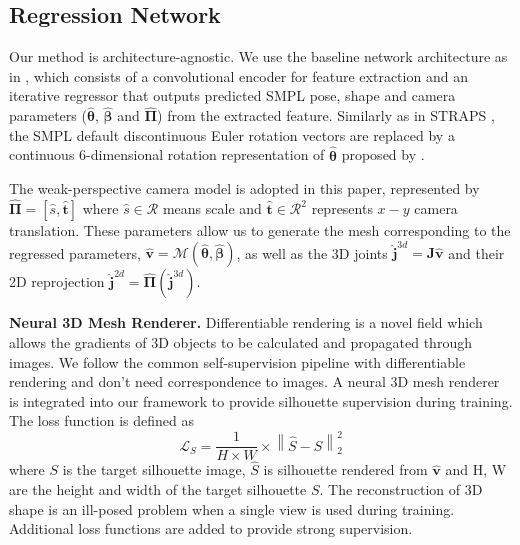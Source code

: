 \documentclass[journal]{IEEEtran}
\begin{document}
\subsection{Regression Network}
\label{sec:regression}
Our method is architecture-agnostic. We use the baseline network architecture as in \cite{ kanazawa2018end, kolotouros2019spin,STRAPS2020BMVC}, which consists of a convolutional encoder for feature extraction and an iterative regressor that outputs predicted SMPL pose, shape and camera parameters ($\hat{\bm{\theta}}$, $\hat{\bm{\beta}}$ and $\hat{\bm{\Pi}}$) from the extracted feature. Similarly as in STRAPS \cite{STRAPS2020BMVC}, the SMPL default discontinuous Euler rotation vectors are replaced by a continuous 6-dimensional rotation representation of $\hat{\bm{\theta}}$ proposed by \cite{zhou2019continuity}.

The weak-perspective camera model is adopted in this paper, represented by $\hat{\bm{\Pi}} = [\hat{s},\hat{\bm{t}}]$ where $\hat{s} \in \mathcal{R}$ means scale and $\hat{\bm{t}} \in \mathcal{R}^2$ represents ${x-y}$ camera translation. These parameters allow us to generate the mesh corresponding to the regressed parameters, $\hat{\bm{v}}=\mathcal{M}(\hat{\bm{\theta}}, \hat{\bm{\beta}})$, as well as the 3D joints $\hat{\bm{j}}^{3d} = \bm{J}\hat{\bm{v}}$ and their 2D reprojection $\hat{\bm{j}}^{2d}=\hat{\bm{\Pi}}(\hat{\bm{j}}^{3d})$.


\noindent\textbf{Neural 3D Mesh Renderer.} Differentiable rendering is a novel field which allows the gradients of 3D objects to be calculated and propagated through images. We follow the common self-supervision pipeline with differentiable rendering and don't need correspondence to images. A neural 3D mesh renderer  \cite{kato2018neural} is integrated into our framework to provide silhouette supervision during training. The loss function is defined as 
\begin{equation}\label{eq_L_sil}
    \mathcal{L} _{S} = \frac{1}{H\times {W}}\times \left \| \hat{S} - S  \right \|  _{2}^{2}
\end{equation}
where $S$ is the target silhouette image, $\hat{S}$ is silhouette rendered from $\hat{\bm{v}}$ and H, W are the height and width of the target silhouette $S$. The reconstruction of 3D shape is an ill-posed problem when a single view is used during training. Additional loss functions are added to provide strong supervision.
\end{document}
